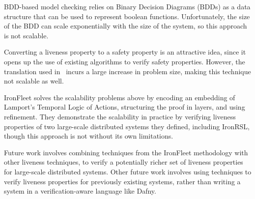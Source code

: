 \documentclass{llncs}
\begin{document}
BDD-based model checking relies on Binary Decision Diagrams (BDDs) as a data
structure that can be used to represent boolean functions. Unfortunately, the
size of the BDD can scale exponentially with the size of the system, so this
approach is not scalable.

Converting a liveness property to a safety property is an attractive idea, since
it opens up the use of existing algorithms to verify safety properties. However,
the translation used in~\cite{Schuppan2006} incurs a large increase in problem
size, making this technique not scalable as well.

IronFleet solves the scalability problems above by encoding an embedding of
Lamport's Temporal Logic of Actions, structuring the proof in layers, and using 
refinement. They demonstrate the scalability in
practice by verifying liveness properties of two large-scale distributed systems
they defined, including IronRSL, though this approach is not without its own
limitations.

Future work involves combining techniques from the IronFleet methodology with
other liveness techniques, to verify a potentially richer set of liveness
properties for large-scale distributed systems. Other future work involves using
techniques to verify liveness properties for previously existing systems, rather
than writing a system in a verification-aware language like Dafny.

%
%



\end{document}
